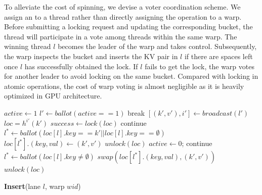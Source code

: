 To alleviate the cost of spinning, we devise a voter coordination scheme. 
We assign an  to a thread rather than directly assigning the operation to a warp. Before submitting a locking request and updating the corresponding bucket, the thread will participate in a vote among threads within the same warp. 
The winning thread $l$ becomes the leader of the warp and takes control. Subsequently, the warp inspects the bucket and inserts the KV pair in $l$ if there are spaces left once $l$ has successfully obtained the lock.
If $l$ fails to get the lock, the warp votes for another leader to avoid locking on the same bucket.
Compared with locking in atomic operations, the cost of warp voting is almost negligible as it is heavily optimized in GPU architecture.  


\begin{algorithm}[t]
	\begin{algorithmic}[1]
		\State $active \gets 1$	\label{algo:insert:active:start}
		\State $l' \gets ballot(active == 1)$ \label{algo:insert:vote:start}
		\State break \label{algo:insert:active:end}
		\EndIf
		\State $[(k',v'),i'] \gets broadcast(l')$ \label{algo:insert:lock:start}
		\State $loc = h^{i'}(k')$
		\State $success \gets lock(loc)$ \label{algo:insert:lock:end}
		\EndIf
		\State continue					\label{algo:insert:vote:end}
		\EndIf
		\State $l^* \gets ballot(loc[l].key == k' || loc[l].key ==\emptyset)$ \label{algo:insert:write:start}
		\State $loc[l^*].(key,val) \gets (k',v')$
		\State $unlock(loc)$
		\State $active \gets 0$;
		\State continue			\label{algo:insert:write:end}
		\EndIf
		\State $l^* \gets ballot(loc[l].key \neq \emptyset)$
		\State $swap(loc[l^*].(key,val),(k',v'))$
		\State $unlock(loc)$ \label{algo:insert:loop:end}
		\EndIf
		\EndWhile
	\end{algorithmic}
	\caption{\textbf{Insert}(lane $l$, warp $wid$)}\label{algo:insert}
\end{algorithm}

